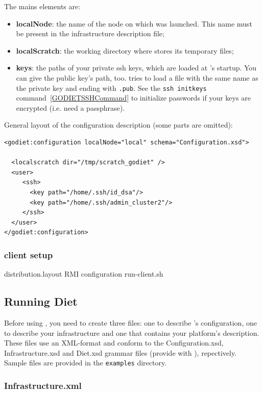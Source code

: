 \vspace{1cm}
The mains elements are:
\begin{itemize}
\item \textbf{localNode}: the name of the node on which \godiet was launched. This name must be present in the infrastructure description file;
\item \textbf{localScratch}: the working directory where \godiet stores its temporary files;
\item \textbf{keys}: the paths of your private ssh keys, which are loaded at \godiet's startup. You can give the public key's path, too. \godiet tries to load a file with the same name as the private key and ending with \verb+.pub+. See the \verb+ssh initkeys+ command~\ref{GODIETSSHCommand} to initialize passwords if your keys are encrypted (i.e. need a passphrase).
\end{itemize}

\vspace{1cm}
General layout of the configuration description (some parts are omitted):
\begin{verbatim}
<godiet:configuration localNode="local" schema="Configuration.xsd">

  <localscratch dir="/tmp/scratch_godiet" />
  <user>
     <ssh>
       <key path="/home/.ssh/id_dsa"/>
       <key path="/home/.ssh/admin_cluster2"/>
     </ssh>
  </user>
</godiet:configuration>
\end{verbatim}



\bla \subsubsection{\godiet client setup}

distribution.layout
RMI configuration
run-client.sh


\subsection{\bla Running Diet}

Before using \godiet, you need to create three files: one to describe \godiet's configuration, one to describe your infrastructure and one that contains your \diet platform's description.
These files use an XML-format and conform to the Configuration.xsd, Infrastructure.xsd and Diet.xsd grammar files (provide with \godiet), repectively.
Sample files are provided in the \verb+examples+ directory. 


\subsubsection{Infrastructure.xml}
\label{GODIETInfrastructureDescription}


